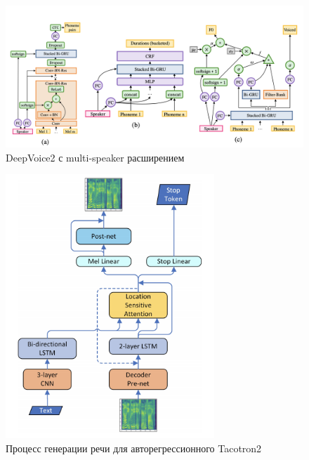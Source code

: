 \begin{figure}[!ht]
\centering
\includegraphics[width=1.0\textwidth]{images/related-work/deepvoice-2.png}
\caption{DeepVoice2 с multi-speaker расширением}
\label{fig:related-work:deepvoice-2}
\end{figure}

\begin{figure}[!ht]
\centering
\includegraphics[width=0.7\textwidth]{images/related-work/tacotron-2.png}
\caption{Процесс генерации речи для авторегрессионного Tacotron2}
\label{fig:related-work:tacotron-2}
\end{figure}

